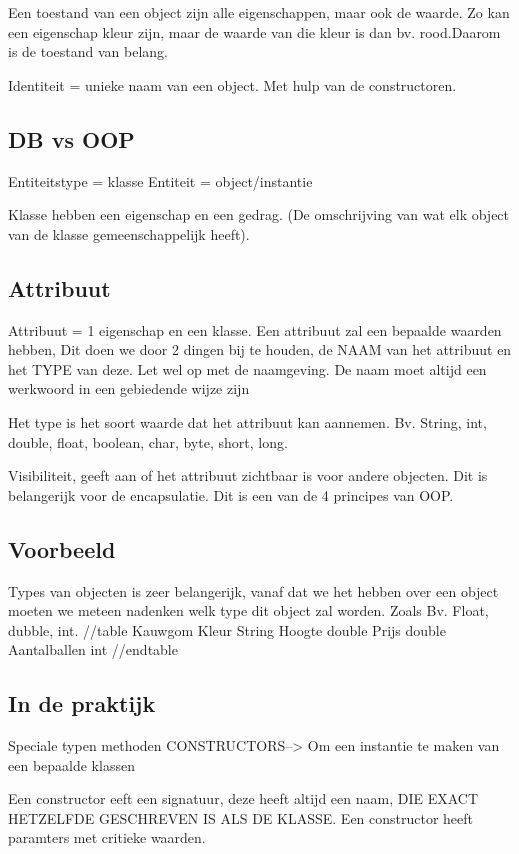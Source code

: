 \documentclass{article}
\begin{document}
Een toestand van een object zijn alle eigenschappen, maar ook de waarde.
Zo kan een eigenschap kleur zijn, maar de waarde van die kleur is dan bv. rood.Daarom is de toestand van belang.

Identiteit = unieke naam van een object.
Met hulp van de constructoren.
\subsection{DB vs OOP}
Entiteitstype = klasse
Entiteit = object/instantie

Klasse hebben een eigenschap en een gedrag. (De omschrijving van wat elk object van de klasse gemeenschappelijk heeft).

\subsection{Attribuut}
Attribuut =  1 eigenschap en een klasse.
Een attribuut zal een bepaalde waarden hebben, Dit doen we door 2 dingen bij te houden, de NAAM van het attribuut en het TYPE van deze. Let wel op met de naamgeving.
De naam moet altijd een werkwoord in een gebiedende wijze zijn

Het type is het soort waarde dat het attribuut kan aannemen. Bv. String, int, double, float, boolean, char, byte, short, long.

Visibiliteit, geeft aan of het attribuut zichtbaar is voor andere objecten. Dit is belangerijk voor de encapsulatie. Dit is een van de 4 principes van OOP.

\subsection{Voorbeeld}
Types van objecten is zeer belangerijk, vanaf dat we het hebben over een object moeten we meteen nadenken welk type dit object zal worden. Zoals Bv. Float, dubble, int.
//table
Kauwgom
Kleur		String
Hoogte		double
Prijs		double
Aantalballen	int
//endtable

\subsection{In de praktijk}
Speciale typen methoden  CONSTRUCTORS--> Om een instantie te maken van een bepaalde klassen

Een constructor eeft een signatuur, deze heeft altijd een naam, DIE EXACT HETZELFDE GESCHREVEN IS ALS DE KLASSE.
Een constructor heeft paramters met critieke waarden.
\end{document}

